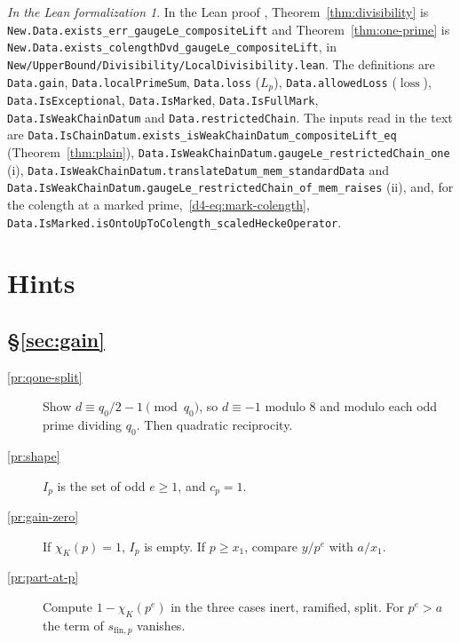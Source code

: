 \documentclass[reqno]{amsart}
\theoremstyle{definition}
\theoremstyle{plain}
\theoremstyle{definition}
\theoremstyle{remark}
\newtheorem*{leanremark}{In the Lean formalization}
\newcommand{\loss}{\operatorname{loss}}
\newcommand{\sfp}{s_{\mathrm{fin},p}}
\newcommand{\tl}[1]{\texttt{#1}}
\begin{document}
\begin{leanremark}
In the Lean proof \cite{GL}, Theorem~\ref{thm:divisibility} is \tl{New.Data.exists\_\allowbreak err\_\allowbreak gaugeLe\_\allowbreak compositeLift} and Theorem~\ref{thm:one-prime} is \tl{New.Data.exists\_\allowbreak colengthDvd\_\allowbreak gaugeLe\_\allowbreak compositeLift}, in \tl{New/\allowbreak UpperBound/\allowbreak Divisibility/\allowbreak LocalDivisibility.lean}.  The definitions are \tl{Data.gain}, \tl{Data.localPrimeSum}, \tl{Data.loss} (\(L_p\)), \tl{Data.allowedLoss} (\(\loss\)), \tl{Data.IsExceptional}, \tl{Data.IsMarked}, \tl{Data.IsFullMark}, \tl{Data.IsWeakChainDatum} and \tl{Data.restrictedChain}.  The inputs read in the text are \tl{Data.IsChainDatum.exists\_\allowbreak isWeakChainDatum\_\allowbreak compositeLift\_\allowbreak eq} (Theorem~\ref{thm:plain}), \tl{Data.IsWeakChainDatum.gaugeLe\_\allowbreak restrictedChain\_\allowbreak one} (i), \tl{Data.IsWeakChainDatum.translateDatum\_\allowbreak mem\_\allowbreak standardData} and \tl{Data.IsWeakChainDatum.gaugeLe\_\allowbreak restrictedChain\_\allowbreak of\_\allowbreak mem\_\allowbreak raises} (ii), and, for the colength at a marked prime,~\eqref{d4-eq:mark-colength}, \tl{Data.IsMarked.isOntoUpToColength\_\allowbreak scaledHeckeOperator}.
\end{leanremark}

\section*{Hints}

\subsection*{\S\ref{sec:gain}}
\begin{description}
\item[\ref{pr:qone-split}] Show \(d \equiv q_0/2 - 1 \pmod{q_0}\), so \(d \equiv -1\) modulo \(8\) and modulo each odd prime dividing \(q_0\).  Then quadratic reciprocity.
\item[\ref{pr:shape}] \(I_p\) is the set of odd \(e \ge 1\), and \(c_p = 1\).
\item[\ref{pr:gain-zero}] If \(\chi_K(p) = 1\), \(I_p\) is empty.  If \(p \ge x_1\), compare \(y/p^e\) with \(a/x_1\).
\item[\ref{pr:part-at-p}] Compute \(1 - \chi_K(p^e)\) in the three cases inert, ramified, split.  For \(p^e > a\) the term of \(\sfp\) vanishes.
\end{description}
\end{document}

